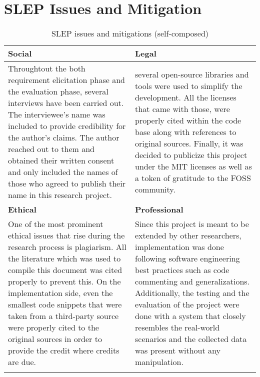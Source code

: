 \section{SLEP Issues and Mitigation}\label{sec:slep}



\begin{longtable}{|p{78mm}|p{78mm}|}
    \hline

    \textbf{Social} & \textbf{Legal} \\ \hline
 Throughtout the both requirement elicitation phase and the evaluation phase, several interviews have been carried out. The interviewee's name was included to provide credibility for the author's claims. The author reached out to them and obtained their written consent and only included the names of those who agreed to publish their name in this research project. & several open-source libraries and tools were used to simplify the development. All the licenses that came with those, were properly cited within the code base along with references to original sources. Finally, it was decided to publicize this project under the MIT licenses as well as a token of gratitude to the FOSS community. \\ \hline

    \textbf{Ethical} & \textbf{Professional} \\ \hline

One of the most prominent ethical issues that rise during the research process is plagiarism.  All the literature which was used to compile this document was cited properly to prevent this. On the implementation side, even the smallest code snippets that were taken from a third-party source were properly cited to the original sources in order to provide the credit where credits are due. & Since this project is meant to be extended by other researchers, implementation was done following software engineering best practices such as code commenting and generalizations. Additionally, the testing and the evaluation of the project were done with a system that closely resembles the real-world scenarios and the collected data was present without any manipulation. \\ \hline

    \caption{SLEP issues and mitigations (self-composed)}
\end{longtable}
